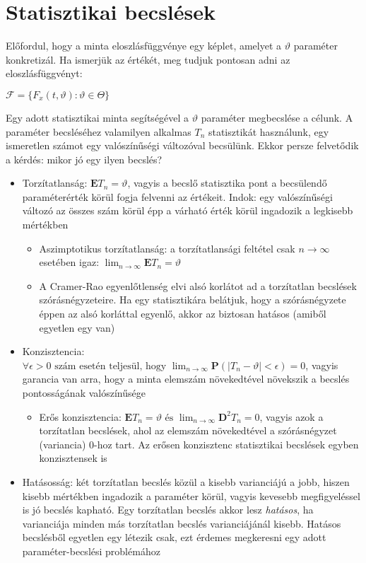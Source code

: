 \chapter{Statisztikai becslések}

Előfordul, hogy a minta eloszlásfüggvénye egy képlet, amelyet a $\vartheta$ paraméter konkretizál. Ha ismerjük az értékét, meg tudjuk pontosan adni az eloszlásfüggvényt: 

$\mathcal{F} = \{ F_x(t,\vartheta):\vartheta\in \Theta \}$

Egy adott statisztikai minta segítségével a $\vartheta$ paraméter megbecslése a célunk. A paraméter becsléséhez valamilyen alkalmas $T_n$ statisztikát használunk, egy ismeretlen számot egy valószínűségi változóval becsülünk. Ekkor persze felvetődik a kérdés: mikor jó egy ilyen becslés?
\begin{itemize}
\item Torzítatlanság: $\mathbf{E}T_n=\vartheta$, vagyis a becslő statisztika pont a becsülendő paraméterérték körül fogja felvenni az értékeit. Indok: egy valószínűségi változó az összes szám körül épp a várható érték körül ingadozik a legkisebb mértékben
	\begin{itemize}
	\item Aszimptotikus torzítatlanság: a torzítatlansági feltétel csak $n \to \infty$ esetében igaz: $\lim_{n \to \infty} \mathbf{E}T_n = \vartheta$
	\item A Cramer-Rao egyenlőtlenség elvi alsó korlátot ad a torzítatlan becslések szórásnégyzeteire. Ha egy statisztikára belátjuk, hogy a szórásnégyzete éppen az alsó korláttal egyenlő, akkor az biztosan hatásos (amiből egyetlen egy van)
	\end{itemize}
\item Konzisztencia: $\forall \epsilon >0 \text{ szám esetén teljesül, hogy } \lim_{n \to \infty}\mathbf{P}(|T_n-\vartheta|<\epsilon) = 0$, vagyis garancia van arra, hogy a minta elemszám növekedtével növekszik a becslés pontosságának valószínűsége
	\begin{itemize}
	\item Erős konzisztencia: $\mathbf{E}
	T_n = \vartheta \text{ és } \lim_{n \to \infty} \mathbf{D}^2T_n = 0$, vagyis azok a torzítatlan becslések, ahol az elemszám növekedtével a szórásnégyzet (variancia) 0-hoz tart. Az erősen konzisztenc statisztikai becslések egyben konzisztensek is
	\end{itemize}
\item Hatásosság: két torzítatlan becslés közül a kisebb varianciájú a jobb, hiszen kisebb mértékben ingadozik a paraméter körül, vagyis kevesebb megfigyeléssel is jó becslés kapható. Egy torzítatlan becslés akkor lesz \emph{hatásos}, ha varianciája minden más torzítatlan becslés varianciájánál kisebb. Hatásos becslésből egyetlen egy létezik csak, ezt érdemes megkeresni egy adott paraméter-becslési problémához

\end{itemize}
